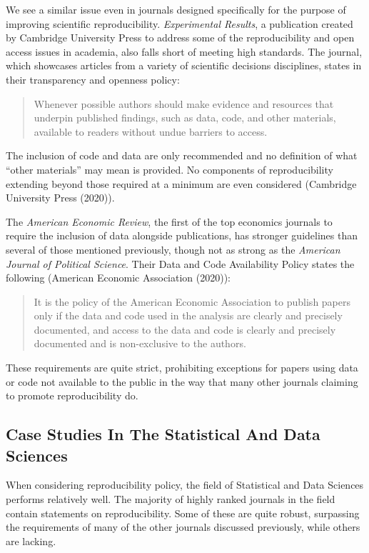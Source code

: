 \documentclass[12pt,twoside]{reedthesis}
\begin{document}
We see a similar issue even in journals designed specifically for the
purpose of improving scientific reproducibility. \emph{Experimental
Results}, a publication created by Cambridge University Press to address
some of the reproducibility and open access issues in academia, also
falls short of meeting high standards. The journal, which showcases
articles from a variety of scientific decisions disciplines, states in
their transparency and openness policy:
\begin{quote}
Whenever possible authors should make evidence and resources that
underpin published findings, such as data, code, and other materials,
available to readers without undue barriers to access.
\end{quote}
The inclusion of code and data are only recommended and no definition of
what ``other materials'' may mean is provided. No components of
reproducibility extending beyond those required at a minimum are even
considered (Cambridge University Press (2020)).

The \emph{American Economic Review}, the first of the top economics
journals to require the inclusion of data alongside publications, has
stronger guidelines than several of those mentioned previously, though
not as strong as the \emph{American Journal of Political Science}. Their
Data and Code Availability Policy states the following (American
Economic Association (2020)):
\begin{quote}
It is the policy of the American Economic Association to publish papers
only if the data and code used in the analysis are clearly and precisely
documented, and access to the data and code is clearly and precisely
documented and is non-exclusive to the authors.
\end{quote}
These requirements are quite strict, prohibiting exceptions for papers
using data or code not available to the public in the way that many
other journals claiming to promote reproducibility do.

\subsection{Case Studies In The Statistical And Data
Sciences}\label{case-studies-in-the-statistical-and-data-sciences}

When considering reproducibility policy, the field of Statistical and
Data Sciences performs relatively well. The majority of highly ranked
journals in the field contain statements on reproducibility. Some of
these are quite robust, surpassing the requirements of many of the other
journals discussed previously, while others are lacking.
\end{document}
